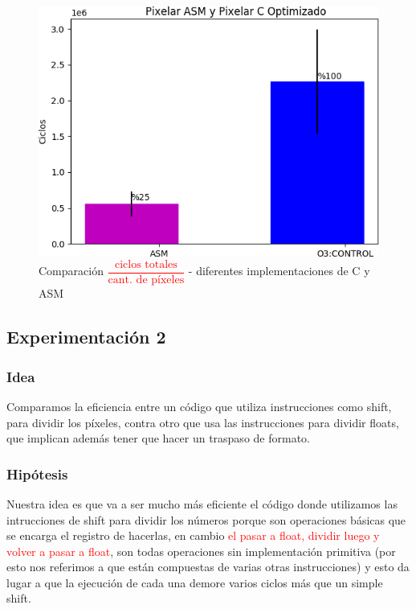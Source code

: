 \begin{figure}[H]
	\centering
	\includegraphics[width = 10 cm, height = 6.5 cm]{imagenes/PixelarvsCONTROL.png}
	\caption[center]{Comparación \textcolor{red}{$\dfrac{\text{ciclos totales}}{\text{cant. de píxeles}}$} - diferentes implementaciones de C y ASM}
\end{figure}

\subsection{Experimentación 2}
\subsubsection{Idea}
\par{Comparamos la eficiencia entre un código que utiliza instrucciones como shift, para dividir los píxeles, contra otro que usa las instrucciones para dividir floats, que implican además tener que hacer un traspaso de formato.}

\subsubsection{Hipótesis}
\par{Nuestra idea es que va a ser mucho más eficiente el código donde utilizamos las intrucciones de shift para dividir los números porque son operaciones básicas que se encarga el registro de hacerlas, en cambio \textcolor{red}{el pasar a float, dividir luego y volver a pasar a float}, son todas operaciones sin implementación primitiva (por esto nos referimos a que están compuestas de varias otras instrucciones) y esto da lugar a que la ejecución de cada una demore varios ciclos más que un simple shift.}

